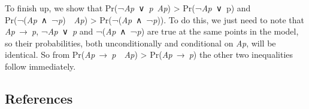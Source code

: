 \documentclass[
  10pt,
  letterpaper,
  DIV=11,
  numbers=noendperiod,
  twoside]{scrartcl}
\begin{document}
To finish up, we show that Pr(¬\emph{Ap}~∨~\emph{p}\textbar~\emph{Ap})
\textgreater{} Pr(¬\emph{Ap}~∨~p) and
Pr(¬(\emph{Ap}~∧~¬\emph{p})~\textbar~\emph{Ap}) \textgreater{}
Pr(¬(\emph{Ap}~∧~¬\emph{p})). To do this, we just need to note that
\emph{Ap}~→~\emph{p}, ¬\emph{Ap}~∨~\emph{p} and ¬(\emph{Ap}~∧~¬\emph{p})
are true at the same points in the model, so their probabilities, both
unconditionally and conditional on \emph{Ap}, will be identical. So from
Pr(\emph{Ap}~→~\emph{p}~\textbar~\emph{Ap}) \textgreater{}
Pr(\emph{Ap}~→~\emph{p}) the other two inequalities follow immediately.

\subsection*{References}\label{references}
\end{document}

